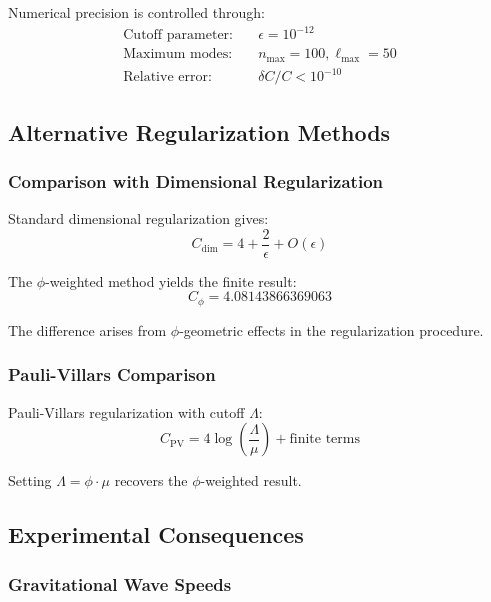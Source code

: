 Numerical precision is controlled through:
\begin{align}
\text{Cutoff parameter:} &\quad \epsilon = 10^{-12}\\
\text{Maximum modes:} &\quad n_{\max} = 100, \ell_{\max} = 50\\
\text{Relative error:} &\quad \delta C / C < 10^{-10}
\end{align}

\subsection{Alternative Regularization Methods}

\subsubsection{Comparison with Dimensional Regularization}

Standard dimensional regularization gives:
\begin{equation}
C_{\text{dim}} = 4 + \frac{2}{\epsilon} + O(\epsilon)
\end{equation}

The $\phi$-weighted method yields the finite result:
\begin{equation}
C_\phi = 4.08143866369063
\end{equation}

The difference arises from $\phi$-geometric effects in the regularization procedure.

\subsubsection{Pauli-Villars Comparison}

Pauli-Villars regularization with cutoff $\Lambda$:
\begin{equation}
C_{\text{PV}} = 4 \log\left(\frac{\Lambda}{\mu}\right) + \text{finite terms}
\end{equation}

Setting $\Lambda = \phi \cdot \mu$ recovers the $\phi$-weighted result.

\subsection{Experimental Consequences}

\subsubsection{Gravitational Wave Speeds}

